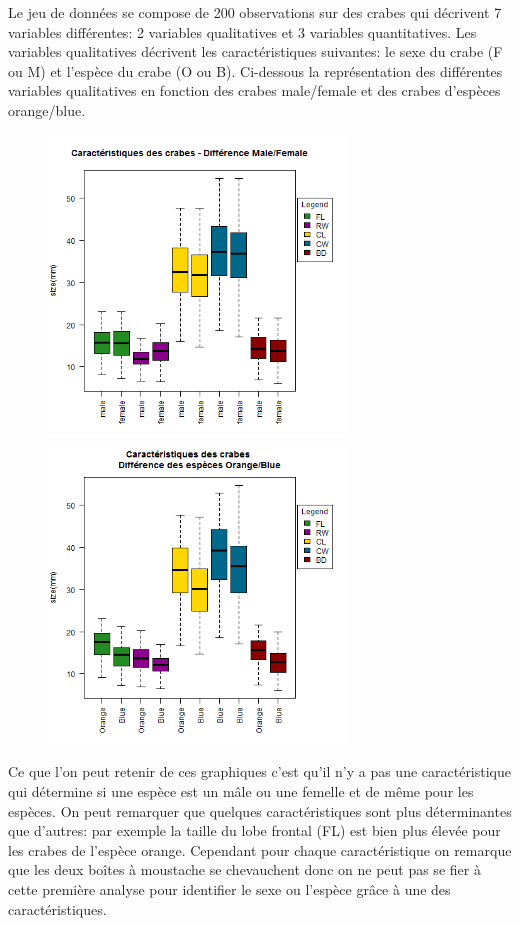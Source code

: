 \documentclass[titlepage]{article}
\begin{document}
\subsubsection{}
Le jeu de données se compose de 200 observations sur des crabes qui décrivent 7 variables différentes: 2 variables qualitatives et 3 variables quantitatives. Les variables qualitatives décrivent les caractéristiques suivantes: le sexe du crabe (F ou M) et l'espèce du crabe (O ou B). Ci-dessous la représentation des différentes variables qualitatives en fonction des crabes male/female et des crabes d'espèces orange/blue.
\begin{figure}[H]
\begin{center}
\includegraphics[width=8cm]{caracteristiquesMF.png}
\includegraphics[width=8cm]{caracteristiquesOB.png}
\end{center}
\end{figure}
Ce que l'on peut retenir de ces graphiques c'est qu'il n'y a pas une caractéristique qui détermine si une espèce est un mâle ou une femelle et de même pour les espèces. On peut remarquer que quelques caractéristiques sont plus déterminantes que d'autres: par exemple la taille du lobe frontal (FL) est bien plus élevée pour les crabes de l'espèce orange. Cependant pour chaque caractéristique on remarque que les deux boîtes à moustache se chevauchent donc on ne peut pas se fier à cette première analyse pour identifier le sexe ou l'espèce grâce à une des caractéristiques.
\end{document}

